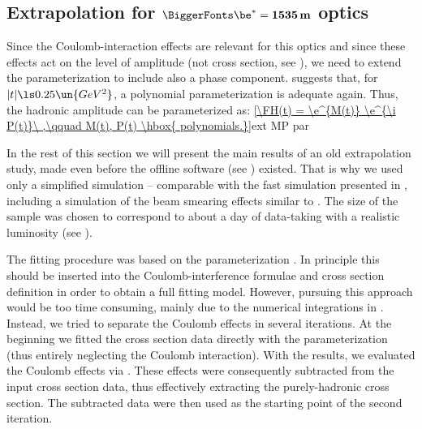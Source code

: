 \bmfig
{}
\emfig

\eject

\def\OutlineLabel{Extrapolation for beta* = 1535 m optics}
\def\TOCLabel{Extrapolation for $\be^* = 1535$ m optics}
\subsection{Extrapolation for $\BiggerFonts\mathbf{\be^* = 1535\,m}$ optics}

Since the Coulomb-interaction effects are relevant for this optics and since these effects act on the level of amplitude (not cross section, see ), we need to extend the parameterization  to include also a phase component.  suggests that, for $|t| \ls 0.25\un{GeV^2}$, a polynomial parameterization is adequate again. Thus, the hadronic amplitude can be parameterized as:
\eqref{\FH(t) = \e^{M(t)} \e^{\i P(t)}\ ,\qquad M(t), P(t) \hbox{ polynomials.}}{ext MP par}

In the rest of this section we will present the main results of an old extrapolation study, made even before the  offline software (see ) existed. That is why we used only a simplified  simulation -- comparable with the fast simulation presented in , including a simulation of the beam smearing effects similar to . The size of the  sample was chosen to correspond to about a day of data-taking with a realistic luminosity (see ).

The fitting procedure was based on the parameterization . In principle this should be inserted into the Coulomb-interference formulae  and cross section definition  in order to obtain a full fitting model. However, pursuing this approach would be too time consuming, mainly due to the numerical integrations in . Instead, we tried to separate the Coulomb effects in several iterations. At the beginning we fitted the cross section data directly with the parameterization  (thus entirely neglecting the Coulomb interaction). With the results, we evaluated the Coulomb effects via . These effects were consequently subtracted from the input cross section data, thus effectively extracting the purely-hadronic cross section. The subtracted data were then used as the starting point of the second iteration.


